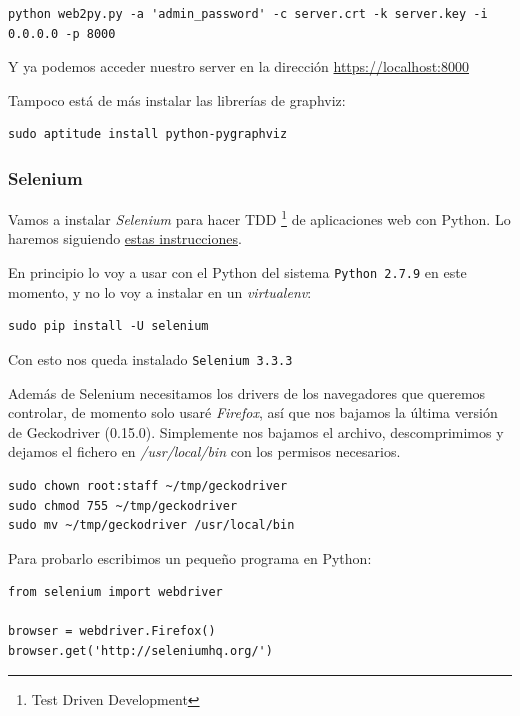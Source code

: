 \documentclass[12pt,spanish,]{scrartcl}
\begin{document}
\begin{verbatim}
python web2py.py -a 'admin_password' -c server.crt -k server.key -i 0.0.0.0 -p 8000
\end{verbatim}

Y ya podemos acceder nuestro server en la dirección
\url{https://localhost:8000}

Tampoco está de más instalar las librerías de graphviz:

\begin{verbatim}
sudo aptitude install python-pygraphviz
\end{verbatim}

\subsubsection{Selenium}\label{selenium}

Vamos a instalar \emph{Selenium} para hacer TDD \footnote{Test Driven
  Development} de aplicaciones web con Python. Lo haremos siguiendo
\href{http://selenium-python.readthedocs.io/index.html}{estas
instrucciones}.

En principio lo voy a usar con el Python del sistema
\texttt{Python\ 2.7.9} en este momento, y no lo voy a instalar en un
\emph{virtualenv}:

\begin{verbatim}
sudo pip install -U selenium
\end{verbatim}

Con esto nos queda instalado \texttt{Selenium\ 3.3.3}

Además de Selenium necesitamos los drivers de los navegadores que
queremos controlar, de momento solo usaré \emph{Firefox}, así que nos
bajamos la última versión de Geckodriver (0.15.0). Simplemente nos
bajamos el archivo, descomprimimos y dejamos el fichero en
\emph{/usr/local/bin} con los permisos necesarios.

\begin{verbatim}
sudo chown root:staff ~/tmp/geckodriver
sudo chmod 755 ~/tmp/geckodriver
sudo mv ~/tmp/geckodriver /usr/local/bin
\end{verbatim}

Para probarlo escribimos un pequeño programa en Python:

\begin{verbatim}
from selenium import webdriver

browser = webdriver.Firefox()
browser.get('http://seleniumhq.org/')
\end{verbatim}
\end{document}
